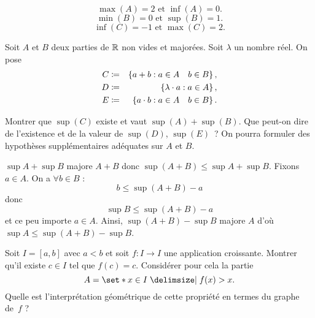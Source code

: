 \documentclass{magnolia}
\begin{document}
\begin{sol}
$$\max(A)=2 \text{ et } \inf(A)=0.$$
$$\min(B)=0 \text{ et } \sup(B)=1.$$
$$\inf(C)=-1 \text{ et } \max(C)=2.$$

\end{sol}


Soit $A$ et $B$ deux parties de $\mathbb{R}$ non vides et majorées. Soit $\lambda$
un nombre réel. On pose
\begin{eqnarray*}
C&\coloneqq&\left\{a+b : a\in A \quad b\in B\right\},\\
D&\coloneqq&\left\{\lambda\cdot a : a\in A\right\},\\
E&\coloneqq&\left\{a\cdot b : a\in A \quad b\in B\right\}.
\end{eqnarray*}
\begin{questions}
\question Montrer que $\sup(C)$ existe et vaut $\sup(A)+\sup(B)$. 
\question Que peut-on dire de l'existence et de la valeur de $\sup(D)$,
  $\sup(E)$~? On pourra formuler des hypothèses supplémentaires adéquates sur $A$
  et $B$.
\end{questions}

\begin{sol}
\begin{questions}
\question$\sup A+\sup B$ majore $A+B$ donc $\sup(A+B)\leq \sup A+\sup B$.
Fixons $a\in A$. On a $\forall b\in B$ :
$$b\leq \sup(A+B)-a$$ donc $$\sup B \leq \sup(A+B)-a$$ et ce peu importe $a\in A$. Ainsi, $\sup(A+B)-\sup B$ majore $A$ d'où $\sup A\leq \sup(A+B)-\sup B$.
\question 
\end{questions}
\end{sol}

Soit $I=[a,b]$ avec $a<b$ et soit $f:I\rightarrow I$ une application
croissante. Montrer qu'il existe $c\in I$ tel que $f(c)=c$. Considérer pour
cela la partie 
$$A=\enstq{x\in I}{f(x)>x}.$$ 
Quelle est l'interprétation géométrique de cette propriété en termes du graphe
de~$f$ ?
\end{document}
